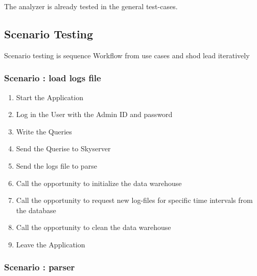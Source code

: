 The analyzer is already tested in the general test-cases.



\subsection{Scenario Testing}

Scenario testing is sequence Workflow from use cases and shod lead iteratively

\renewcommand{\theenumi}{/T\arabic{enumi}0/}
\renewcommand{\labelenumi}{\theenumi}

\subsubsection {Scenario : load logs file} 

\begin{enumerate}
 
\item Start the Application

\item Log in the User with the Admin ID and password

\item Write the Queries

\item Send the Querise to Skyserver

\item Send the logs file to parse

\item Call the opportunity to initialize the data warehouse

\item Call the opportunity to request new log-files for specific time intervals from the
database

\item Call the opportunity to clean the data warehouse %

\item Leave the Application

\end{enumerate} 

\subsubsection {Scenario : parser} 

